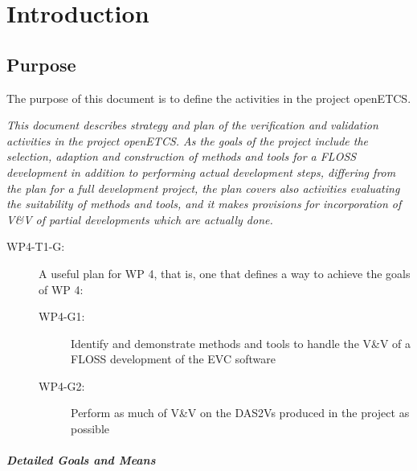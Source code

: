 \documentclass{template/openetcs_report}
\begin{document}



\mainmatter

\chapter{Introduction}

\section{Purpose}
\label{sec:purpose}

The purpose of this document is to define the \vv activities in the
project openETCS.  

{\it This document describes strategy and plan of the
  verification and validation activities in the project openETCS. As
  the goals of the project include the selection, adaption and
  construction of methods and tools for a FLOSS development in
  addition to performing actual development steps, differing from the
  plan for a full development project, the plan covers also activities
  evaluating the suitability of methods and tools, and it makes
  provisions for incorporation of V\&V of partial developments which
  are actually done.}

\begin{description}
\item[WP4-T1-G:] A useful plan for WP 4, that is, one that defines a
way to achieve the goals of WP 4:
  \begin{description}
  \item[WP4-G1:] Identify and demonstrate methods and tools to handle
    the V\&V of a FLOSS development of the EVC software
  \item[WP4-G2:] Perform as much of V\&V on the DAS2Vs produced in the
    project as possible
  \end{description}
\end{description}

\paragraph{Detailed Goals and Means}
\label{sec:detailed-goals-means}
\end{document}
